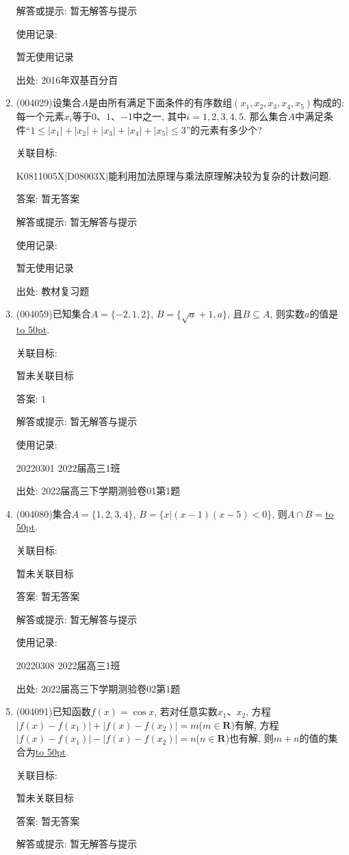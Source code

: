 \documentclass[10pt,a4paper]{article}
\newcommand{\blank}[1]{\underline{\hbox to #1pt{}}}
\begin{document}
\begin{enumerate}[1.]
解答或提示: 暂无解答与提示

使用记录:

暂无使用记录


出处: 2016年双基百分百
\item { (004029)}设集合$A$是由所有满足下面条件的有序数组$(x_1,x_2,x_3,x_4,x_5)$构成的: 每一个元素$x_i$等于$0$、$1$、$-1$中之一, 其中$i=1,2,3,4,5$. 那么集合$A$中满足条件``$1\le |x_1|+|x_2|+|x_3|+|x_4|+|x_5|\le 3$''的元素有多少个?


关联目标:

K0811005X|D08003X|能利用加法原理与乘法原理解决较为复杂的计数问题.

答案: 暂无答案

解答或提示: 暂无解答与提示

使用记录:

暂无使用记录


出处: 教材复习题
\item { (004059)}已知集合$A=\{-2,1,2\}$, $B=\{\sqrt a+1,a\}$, 且$B\subseteq A$, 则实数$a$的值是\blank{50}.


关联目标:

暂未关联目标

答案: $1$

解答或提示: 暂无解答与提示

使用记录:

20220301	2022届高三1班	


出处: 2022届高三下学期测验卷01第1题
\item { (004080)}集合$A=\{1,2,3,4\}$, $B=\{x|(x-1)(x-5)<0\}$, 则$A\cap B=$\blank{50}.


关联目标:

暂未关联目标

答案: 暂无答案

解答或提示: 暂无解答与提示

使用记录:

20220308	2022届高三1班	


出处: 2022届高三下学期测验卷02第1题
\item { (004091)}已知函数$f(x)=\cos x$, 若对任意实数$x_1$、$x_2$, 方程$|f(x)-f(x_1)|+|f(x)-f(x_2)|=m$($m\in \mathbf{R}$)有解, 方程$|f(x)-f(x_1)|-|f(x)-f(x_2)|=n$($n\in \mathbf{R}$)也有解, 则$m+n$的值的集合为\blank{50}.


关联目标:

暂未关联目标

答案: 暂无答案

解答或提示: 暂无解答与提示


\end{enumerate}
\end{document}
